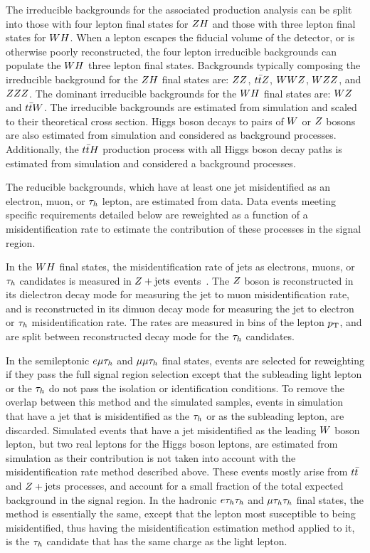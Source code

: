The irreducible backgrounds for the associated production analysis can
be split into those with four lepton final states for $ZH$ and those
with three lepton final states for $WH$. When a lepton escapes the fiducial
volume of the detector, or is otherwise poorly reconstructed, the four
lepton irreducible backgrounds can populate the $WH$ three
lepton final states.
Backgrounds typically composing
the irreducible background for the $ZH$ final states are: $ZZ$, 
$t\bar{t}Z$, $WWZ$, $WZZ$, and $ZZZ$. The dominant
irreducible backgrounds for the $WH$ final states are:
$WZ$ and $t\bar{t}W$. The irreducible backgrounds are 
estimated from simulation and scaled to their theoretical cross section. Higgs 
boson decays to pairs of $W$ or $Z$ bosons 
are also estimated from simulation and considered as background processes. 
Additionally, the $t\bar{t}H$ production process with all Higgs boson decay
paths is estimated from simulation and considered a background processes.

The reducible backgrounds, which have at least one jet misidentified as an electron, 
muon, or $\tau_{h}$ lepton, are estimated from data. 
Data events meeting specific requirements detailed below are reweighted 
as a function of a misidentification rate to estimate the 
contribution of these processes in the signal region. 

In the $WH$ final states, the misidentification rate of jets as electrons, muons, 
or $\tau_{h}$ candidates is measured in $Z+\textrm{jets}$ events~\cite{HIG-18-007}. The $Z$ boson is reconstructed 
in its dielectron decay mode for measuring the jet to muon misidentification
rate, and is reconstructed in its dimuon decay mode for measuring the jet to electron
or $\tau_{h}$ misidentification rate.
The rates are measured in bins of the lepton $p_\mathrm{T}$, and are 
split between reconstructed decay mode for the $\tau_{h}$ candidates. 

In the semileptonic $e\mu\tau_{h}$ and $\mu\mu\tau_{h}$ final states, 
events are selected for reweighting if they pass the full signal region 
selection except that the subleading light lepton or the $\tau_{h}$ do not 
pass the isolation or identification conditions.
To remove the overlap between this method and the simulated samples, events in simulation that have a jet that is 
misidentified as the $\tau_{h}$ or as the subleading lepton, are discarded. Simulated 
events that have a jet misidentified as the leading $W$ boson lepton, but two real leptons 
for the Higgs boson leptons, are estimated from simulation as their 
contribution is not taken into account with the misidentification rate method 
described above. These events mostly arise from $t\bar{t}$ and $Z+\textrm{jets}$ processes, 
and account for a small fraction of the total expected background in the signal region. 
In the hadronic $e\tau_{h}\tau_{h}$ and $\mu\tau_{h}\tau_{h}$ final states, 
the method is essentially the same, except that the lepton most susceptible to being misidentified,
thus having the misidentification estimation method applied to it, 
is the $\tau_{h}$ candidate that has the same charge as the light lepton.  

